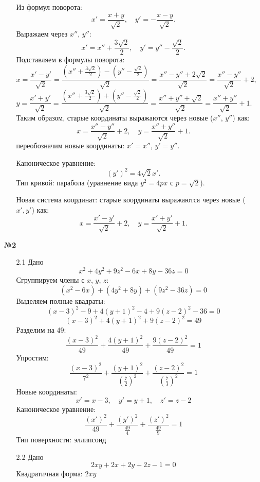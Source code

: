 \documentclass[a4paper]{article}
\begin{document}
\begin{enumerate}
\begin{enumerate}
\[    \]  
    Из формул поворота:  
    \[
    x' = \frac{x + y}{\sqrt{2}}, \quad y' = -\frac{x - y}{\sqrt{2}}.
    \]  
    Выражаем через \( x'' \), \( y'' \):  
    \[
    x' = x'' + \frac{3\sqrt{2}}{2}, \quad y' = y'' - \frac{\sqrt{2}}{2}.
    \]  
    Подставляем в формулы поворота:  
    \[
    x = \frac{x' - y'}{\sqrt{2}} = \frac{ \left( x'' + \frac{3\sqrt{2}}{2} \right) - \left( y'' - \frac{\sqrt{2}}{2} \right) }{\sqrt{2}} = \frac{x'' - y'' + 2\sqrt{2}}{\sqrt{2}} = \frac{x'' - y''}{\sqrt{2}} + 2,
    \]  
    \[
    y = \frac{x' + y'}{\sqrt{2}} = \frac{ \left( x'' + \frac{3\sqrt{2}}{2} \right) + \left( y'' - \frac{\sqrt{2}}{2} \right) }{\sqrt{2}} = \frac{x'' + y'' + \sqrt{2}}{\sqrt{2}} = \frac{x'' + y''}{\sqrt{2}} + 1.
    \]  
    Таким образом, старые координаты выражаются через новые (\( x'' \), \( y'' \)) как:  
    \[
    x = \frac{x'' - y''}{\sqrt{2}} + 2, \quad y = \frac{x'' + y''}{\sqrt{2}} + 1.
    \]  
    переобозначим новые координаты: \( x' = x'' \), \( y' = y'' \).  

    Каноническое уравнение:  
    \[
    (y')^2 = 4\sqrt{2}  x'.
    \]  
    Тип кривой: парабола (уравнение вида \( y^2 = 4px \) с \( p = \sqrt{2} \)).

    Новая система координат: старые координаты выражаются через новые (\( x', y' \)) как:  
    \[
    x = \frac{x' - y'}{\sqrt{2}} + 2, \quad y = \frac{x' + y'}{\sqrt{2}} + 1.
    \]  
  \end{enumerate}

  \item[\textbf{№2}]\begin{enumerate}
    \item[2.1]Дано 
    \[x^2 + 4y^2 + 9z^2 - 6x + 8y - 36z = 0\]
    Сгруппируем члены с \(x\), \(y\), \(z\):  
    \[(x^2 - 6x) + (4y^2 + 8y) + (9z^2 - 36z) = 0\] 
    Выделяем полные квадраты:  
    \[(x - 3)^2 - 9 + 4(y + 1)^2 - 4 + 9(z - 2)^2 - 36 = 0\]  
    \[(x - 3)^2 + 4(y + 1)^2 + 9(z - 2)^2 = 49\]  
    Разделим на 49:  
    \[\frac{(x - 3)^2}{49} + \frac{4(y + 1)^2}{49} + \frac{9(z - 2)^2}{49} = 1\]  
    Упростим:  
    \[\frac{(x - 3)^2}{7^2} + \frac{(y + 1)^2}{\left(\frac{7}{2}\right)^2} + \frac{(z - 2)^2}{\left(\frac{7}{3}\right)^2} = 1\]  
    Новые координаты:  
    \[x' = x - 3, \quad y' = y + 1, \quad z' = z - 2\]  
    Каноническое уравнение:  
    \[\frac{(x')^2}{49} + \frac{(y')^2}{\frac{49}{4}} + \frac{(z')^2}{\frac{49}{9}} = 1\]  
    Тип поверхности: эллипсоид\\

    \item[2.2]Дано 
    \[2xy + 2x + 2y + 2z - 1 = 0\]
    Квадратичная форма: \(2xy\) 


\end{enumerate}
\end{enumerate}
\end{document}
